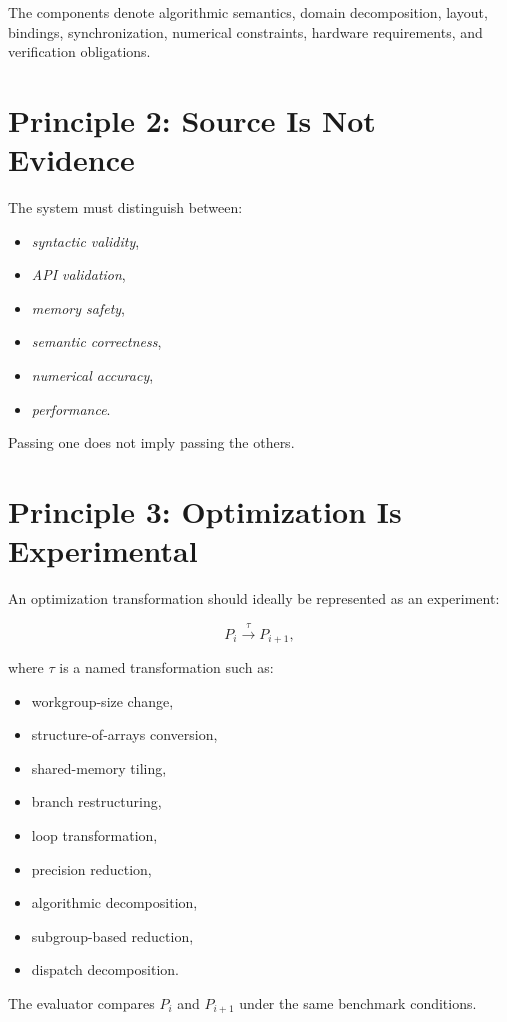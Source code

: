 \documentclass[11pt,a4paper,oneside]{report}
\begin{document}
The components denote algorithmic semantics, domain decomposition, layout, bindings, synchronization,
numerical constraints, hardware requirements, and verification obligations.

\section{Principle 2: Source Is Not Evidence}

The system must distinguish between:

\begin{itemize}
  \item \emph{syntactic validity},
  \item \emph{API validation},
  \item \emph{memory safety},
  \item \emph{semantic correctness},
  \item \emph{numerical accuracy},
  \item \emph{performance}.
\end{itemize}

Passing one does not imply passing the others.

\section{Principle 3: Optimization Is Experimental}

An optimization transformation should ideally be represented as an experiment:

\[
P_i
\xrightarrow{\tau}
P_{i+1},
\]

where $\tau$ is a named transformation such as:

\begin{itemize}
  \item workgroup-size change,
  \item structure-of-arrays conversion,
  \item shared-memory tiling,
  \item branch restructuring,
  \item loop transformation,
  \item precision reduction,
  \item algorithmic decomposition,
  \item subgroup-based reduction,
  \item dispatch decomposition.
\end{itemize}

The evaluator compares $P_i$ and $P_{i+1}$ under the same benchmark conditions.
\end{document}
